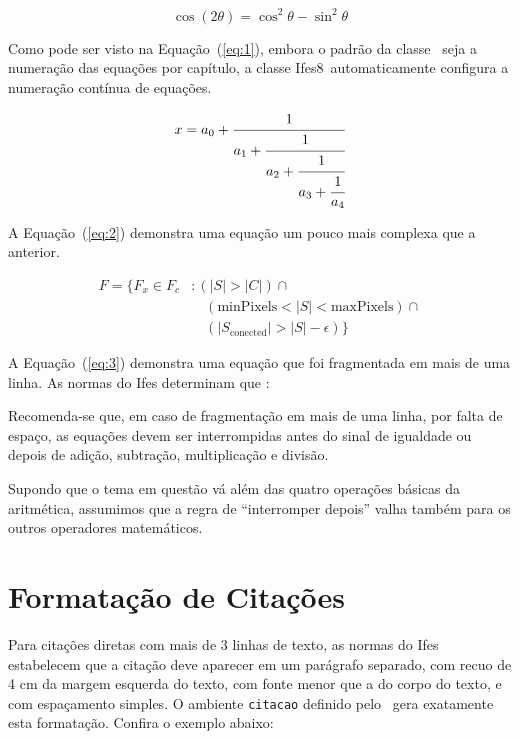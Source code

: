 \documentclass[times,english,brazil,oneside,section=TITLE]{ifes8}
\newcommand{\ifestex}{\textsf{Ifes$8$}}
\begin{document}
\begin{equation}
  \label{eq:1}
  \cos (2\theta) = \cos^2 \theta - \sin^2 \theta
\end{equation}

Como pode ser visto na Equação~(\ref{eq:1}), embora o padrão da classe
\abnTeX\ seja a numeração das equações por capítulo, a classe
\ifestex\ automaticamente configura a numeração contínua de equações.

\begin{equation}
  \label{eq:2}
  x = a_0 + \cfrac{1}{a_1 
    + \cfrac{1}{a_2 
      + \cfrac{1}{a_3 + \cfrac{1}{a_4}}}}
\end{equation}

A Equação~(\ref{eq:2}) demonstra uma equação um pouco mais complexa
que a anterior.

\begin{equation}
  \label{eq:3}
  \begin{split}
    F = \{F_{x} \in  F_{c} &: (|S| > |C|) \cap {}\\
    &\quad (\text{minPixels}  < |S| < \text{maxPixels}) \cap {} \\
    &\quad (|S_{\text{conected}}| > |S| - \epsilon) \}
  \end{split}
\end{equation}

A Equação~(\ref{eq:3}) demonstra uma equação que foi fragmentada em
mais de uma linha. As normas do Ifes determinam que
\cite[p.~38]{Ifes2017}:

\begin{citacao}
  Recomenda-se que, em caso de fragmentação em mais de uma linha, por
  falta de espaço, as equações devem ser interrompidas antes do sinal
  de igualdade ou depois de adição, subtração, multiplicação e
  divisão.
\end{citacao}

Supondo que o tema em questão vá além das quatro operações básicas da
aritmética, assumimos que a regra de ``interromper depois'' valha
também para os outros operadores matemáticos.


\section{Formatação de Citações}
\label{sec:format-citac}

Para citações diretas com mais de 3 linhas de texto, as normas do Ifes
estabelecem que a citação deve aparecer em um parágrafo separado, com
recuo de 4 cm da margem esquerda do texto, com fonte menor que a do
corpo do texto, e com espaçamento simples. O ambiente \texttt{citacao}
definido pelo \abnTeX\ gera exatamente esta formatação. Confira o
exemplo abaixo:
\end{document}
